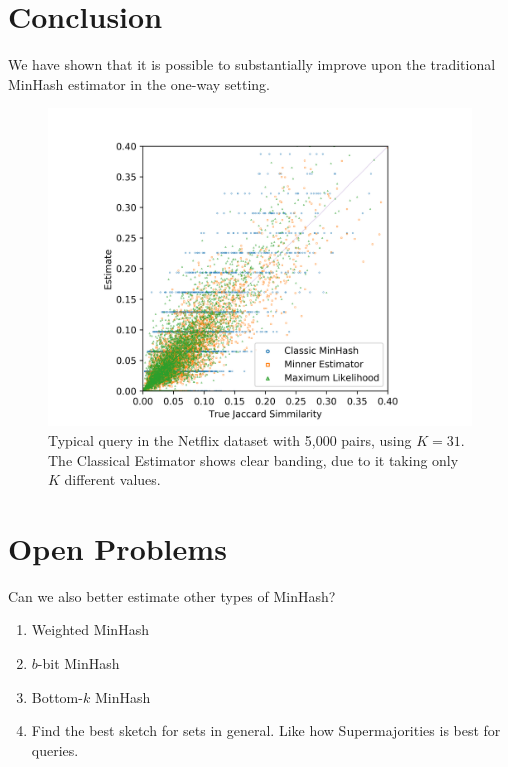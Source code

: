 
\section{Conclusion}

We have shown that it is possible to substantially improve upon the traditional MinHash estimator in the one-way setting.

\begin{figure}[h]
   \centering
   \includegraphics[trim=10 0 10 30,clip,width=\linewidth]{figures/scatter}
   \caption{Typical query in the Netflix dataset with 5,000 pairs, using $K=31$.
      The Classical Estimator shows clear banding, due to it taking only $K$ different values.
   }
\end{figure}


\section{Open Problems}

Can we also better estimate other types of MinHash?
\begin{enumerate}
   \item Weighted MinHash
   \item $b$-bit MinHash
   \item Bottom-$k$ MinHash
   \item Find the best sketch for sets in general. Like how Supermajorities is best for queries.
\end{enumerate}


